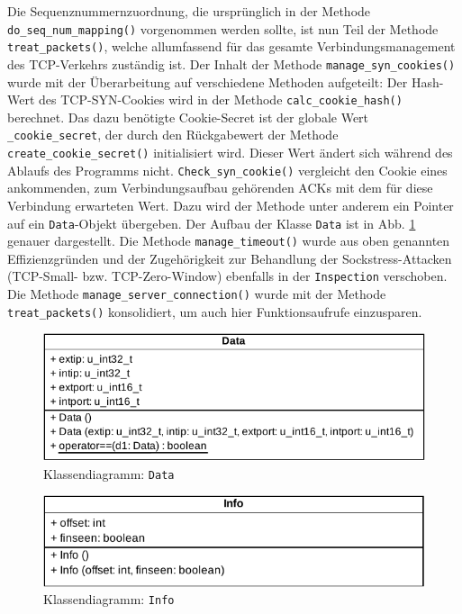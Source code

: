 \documentclass[../review_3.tex]{subfiles}
\begin{document}
Die Sequenznummernzuordnung, die ursprünglich in der Methode \texttt{do\_seq\_num\_mapping()} vorgenommen werden sollte, ist nun Teil der Methode \texttt{treat\_packets()}, welche allumfassend für das gesamte Verbindungsmanagement des TCP-Verkehrs zuständig ist.
Der Inhalt der Methode \texttt{manage\_syn\_cookies()} wurde mit der Überarbeitung auf verschiedene Methoden aufgeteilt: Der Hash-Wert des TCP-SYN-Cookies wird in der Methode \texttt{calc\_cookie\_hash()} berechnet. Das dazu benötigte Cookie-Secret ist der globale Wert \texttt{\_cookie\_secret}, der durch den Rückgabewert der Methode \texttt{create\_cookie\_secret()} initialisiert wird. Dieser Wert ändert sich während des Ablaufs des Programms nicht. \texttt{Check\_syn\_cookie()} vergleicht den Cookie eines ankommenden, zum Verbindungsaufbau gehörenden ACKs mit dem für diese Verbindung erwarteten Wert. Dazu wird der Methode unter anderem ein Pointer auf ein \texttt{Data}-Objekt übergeben. Der Aufbau der Klasse \texttt{Data} ist in Abb. \ref{data} genauer dargestellt.
Die Methode \texttt{manage\_timeout()} wurde aus oben genannten Effizienzgründen und der Zugehörigkeit zur Behandlung der Sockstress-Attacken (TCP-Small- bzw. TCP-Zero-Window) ebenfalls in der \texttt{Inspection} verschoben.
Die Methode \texttt{manage\_server\_connection()} wurde mit der Methode \texttt{treat\_packets()} konsolidiert, um auch hier Funktionsaufrufe einzusparen.
\begin{figure}[h]
    \centering
    \includegraphics[width=0.7\linewidth]{img/Data.pdf}
    \caption{Klassendiagramm: \texttt{Data}}
    \label{data}
\end{figure}

\begin{figure}[h]
    \centering
    \includegraphics[width=0.7\linewidth]{img/Info.pdf}
    \caption{Klassendiagramm: \texttt{Info}}
    \label{info}
\end{figure}
\end{document}

